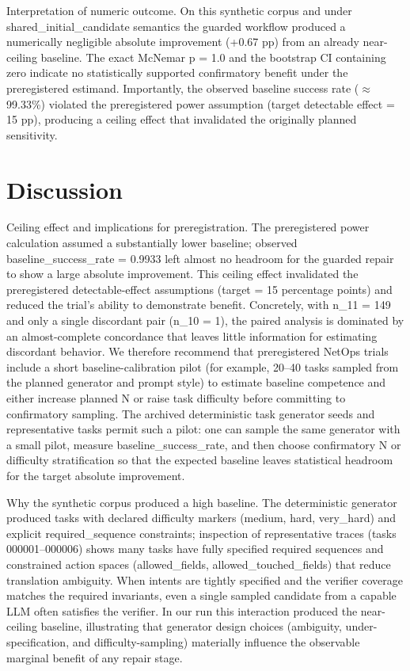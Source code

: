 \documentclass[conference]{IEEEtran}
\begin{document}
Interpretation of numeric outcome. On this synthetic corpus and under shared\_initial\_candidate semantics the guarded workflow produced a numerically negligible absolute improvement (+0.67 pp) from an already near-ceiling baseline. The exact McNemar p = 1.0 and the bootstrap CI containing zero indicate no statistically supported confirmatory benefit under the preregistered estimand. Importantly, the observed baseline success rate (\ensuremath{\approx}99.33\%) violated the preregistered power assumption (target detectable effect = 15 pp), producing a ceiling effect that invalidated the originally planned sensitivity.

\section{Discussion}
Ceiling effect and implications for preregistration. The preregistered power calculation assumed a substantially lower baseline; observed baseline\_success\_rate = 0.9933 left almost no headroom for the guarded repair to show a large absolute improvement. This ceiling effect invalidated the preregistered detectable-effect assumptions (target = 15 percentage points) and reduced the trial's ability to demonstrate benefit. Concretely, with n\_11 = 149 and only a single discordant pair (n\_10 = 1), the paired analysis is dominated by an almost-complete concordance that leaves little information for estimating discordant behavior. We therefore recommend that preregistered NetOps trials include a short baseline-calibration pilot (for example, 20--40 tasks sampled from the planned generator and prompt style) to estimate baseline competence and either increase planned N or raise task difficulty before committing to confirmatory sampling. The archived deterministic task generator seeds and representative tasks permit such a pilot: one can sample the same generator with a small pilot, measure baseline\_success\_rate, and then choose confirmatory N or difficulty stratification so that the expected baseline leaves statistical headroom for the target absolute improvement.

Why the synthetic corpus produced a high baseline. The deterministic generator produced tasks with declared difficulty markers (medium, hard, very\_hard) and explicit required\_sequence constraints; inspection of representative traces (tasks 000001--000006) shows many tasks have fully specified required sequences and constrained action spaces (allowed\_fields, allowed\_touched\_fields) that reduce translation ambiguity. When intents are tightly specified and the verifier coverage matches the required invariants, even a single sampled candidate from a capable LLM often satisfies the verifier. In our run this interaction produced the near-ceiling baseline, illustrating that generator design choices (ambiguity, under-specification, and difficulty-sampling) materially influence the observable marginal benefit of any repair stage.
\end{document}
